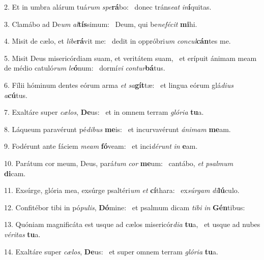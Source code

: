 2. Et in umbra alárum tuá\textit{rum} \textit{spe}\textbf{rá}bo: \ast\  donec tráns\textit{e}\textit{at} \textit{in}\textbf{í}quitas.\

3. Clamábo ad De\textit{um} \textit{al}\textbf{tís}simum: \ast\  Deum, qui be\textit{ne}\textit{fé}\textit{cit} \textbf{mi}hi.\

4. Misit de cælo, et \textit{li}\textit{be}\textbf{rá}vit me: \ast\  dedit in oppróbri\textit{um} \textit{con}\textit{cul}\textbf{cán}tes me.\

5. Misit Deus misericórdiam suam, et veritátem suam, \dag\  et erípuit ánimam meam de médio catuló\textit{rum} \textit{le}\textbf{ó}num: \ast\  dormí\textit{vi} \textit{con}\textit{tur}\textbf{bá}tus.\

6. Fílii hóminum dentes eórum arma \textit{et} \textit{sa}\textbf{gít}tæ: \ast\  et lingua eórum glá\textit{di}\textit{us} \textit{a}\textbf{cú}tus.\

7. Exaltáre super \textit{cæ}\textit{los}, \textbf{De}us: \ast\  et in omnem terram \textit{gló}\textit{ri}\textit{a} \textbf{tu}a.\

8. Láqueum paravérunt pé\textit{di}\textit{bus} \textbf{me}is: \ast\  et incurvavérunt \textit{á}\textit{ni}\textit{mam} \textbf{me}am.\

9. Fodérunt ante fáciem \textit{me}\textit{am} \textbf{fó}veam: \ast\  et inci\textit{dé}\textit{runt} \textit{in} \textbf{e}am.\

10. Parátum cor meum, Deus, pará\textit{tum} \textit{cor} \textbf{me}um: \ast\  cantábo, \textit{et} \textit{psal}\textit{mum} \textbf{di}cam.\

11. Exsúrge, glória mea, exsúrge psaltéri\textit{um} \textit{et} \textbf{cí}thara: \ast\  ex\textit{súr}\textit{gam} \textit{di}\textbf{lú}culo.\

12. Confitébor tibi in pó\textit{pu}\textit{lis}, \textbf{Dó}mine: \ast\  et psalmum dicam \textit{ti}\textit{bi} \textit{in} \textbf{Gén}tibus:\

13. Quóniam magnificáta est usque ad cælos misericór\textit{di}\textit{a} \textbf{tu}a, \ast\  et usque ad nubes \textit{vé}\textit{ri}\textit{tas} \textbf{tu}a.\

14. Exaltáre super \textit{cæ}\textit{los}, \textbf{De}us: \ast\  et super omnem terram \textit{gló}\textit{ri}\textit{a} \textbf{tu}a.\

